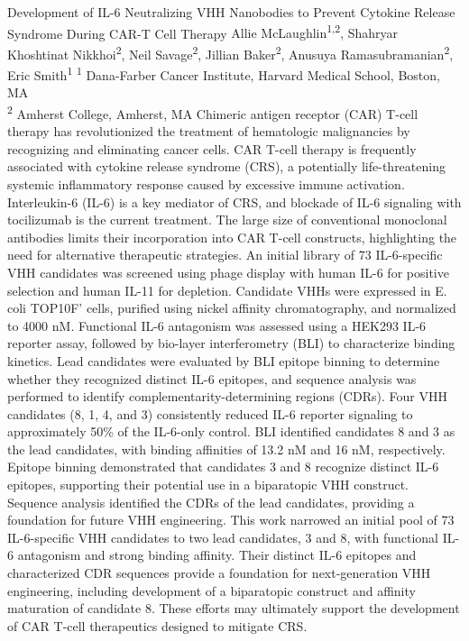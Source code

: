 \makeabstract
    {
    Development of IL-6 Neutralizing VHH Nanobodies to Prevent Cytokine Release Syndrome During CAR-T Cell Therapy
    }
    {
    Allie McLaughlin\textsuperscript{1,2}, Shahryar Khoshtinat Nikkhoi\textsuperscript{2}, Neil Savage\textsuperscript{2}, Jillian Baker\textsuperscript{2}, Anusuya Ramasubramanian\textsuperscript{2}, Eric Smith\textsuperscript{1}
    }
    {
    \textsuperscript{1} Dana-Farber Cancer Institute, Harvard Medical School, Boston, MA \\
\textsuperscript{2} Amherst College, Amherst, MA
    }
    {
    Chimeric antigen receptor (CAR) T-cell therapy has revolutionized the treatment of hematologic malignancies by recognizing and eliminating cancer cells. CAR T-cell therapy is frequently associated with cytokine release syndrome (CRS), a potentially life-threatening systemic inflammatory response caused by excessive immune activation. Interleukin-6 (IL-6) is a key mediator of CRS, and blockade of IL-6 signaling with tocilizumab is the current treatment. The large size of conventional monoclonal antibodies limits their incorporation into CAR T-cell constructs, highlighting the need for alternative therapeutic strategies.
    }
    {
    An initial library of 73 IL-6-specific VHH candidates was screened using phage display with human IL-6 for positive selection and human IL-11 for depletion. Candidate VHHs were expressed in E. coli TOP10F' cells, purified using nickel affinity chromatography, and normalized to 4000 nM. Functional IL-6 antagonism was assessed using a HEK293 IL-6 reporter assay, followed by bio-layer interferometry (BLI) to characterize binding kinetics. Lead candidates were evaluated by BLI epitope binning to determine whether they recognized distinct IL-6 epitopes, and sequence analysis was performed to identify complementarity-determining regions (CDRs). 
    }
    {
    Four VHH candidates (8, 1, 4, and 3) consistently reduced IL-6 reporter signaling to approximately 50\% of the IL-6-only control. BLI identified candidates 8 and 3 as the lead candidates, with binding affinities of 13.2 nM and 16 nM, respectively. Epitope binning demonstrated that candidates 3 and 8 recognize distinct IL-6 epitopes, supporting their potential use in a biparatopic VHH construct. Sequence analysis identified the CDRs of the lead candidates, providing a foundation for future VHH engineering.
    }
    {
    This work narrowed an initial pool of 73 IL-6-specific VHH candidates to two lead candidates, 3 and 8, with functional IL-6 antagonism and strong binding affinity. Their distinct IL-6 epitopes and characterized CDR sequences provide a foundation for next-generation VHH engineering, including development of a biparatopic construct and affinity maturation of candidate 8. These efforts may ultimately support the development of CAR T-cell therapeutics designed to mitigate CRS. 
    }

    \newpage
    